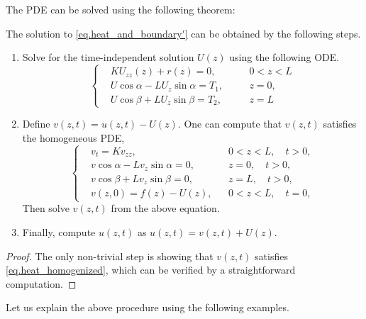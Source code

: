 The PDE can be solved using the following theorem:
\begin{theorem}\label{th.solve_nonhomogeneous}
    The solution to \eqref{eq.heat_and_boundary'} can be obtained by the following steps.
    \begin{enumerate}
        \item Solve for the time-independent solution $U(z)$ using the following ODE.
        \begin{equation}\label{eq.time_independent_sol'}
        \left\{\begin{aligned} 
            &K U_{z z}(z) + r(z) = 0, && 0<z<L
            \\ 
            &U \cos \alpha-L U_z \sin \alpha=T_1,\quad && z=0, 
            \\ 
            &U \cos \beta+L U_z \sin \beta=T_2, && z=L
        \end{aligned}\right.
    \end{equation}
    \item Define $v(z, t) = u(z, t) - U(z)$. One can compute that $v(z, t)$ satisfies the homogeneous PDE,
    \begin{equation}\label{eq.heat_homogenized}
        \left\{\begin{aligned} 
            &v_t=K v_{z z}, && 0<z<L, \quad t>0, 
            \\ 
            &v \cos \alpha-L v_z \sin \alpha=0,\quad && z=0, \quad t>0, 
            \\ 
            &v \cos \beta+L v_z \sin \beta=0, && z=L, \quad t>0, 
            \\
            &v(z, 0)=f(z)-U(z), && 0<z<L, \quad t=0,
        \end{aligned}\right.
    \end{equation}
    Then solve $v(z, t)$ from the above equation.
    \item Finally, compute $u(z, t)$ as $u(z, t) = v(z, t) + U(z)$.
    \end{enumerate}
\end{theorem}
\begin{proof}
    The only non-trivial step is showing that $v(z, t)$ satisfies \eqref{eq.heat_homogenized}, which can be verified by a straightforward computation.
\end{proof}

Let us explain the above procedure using the following examples.

